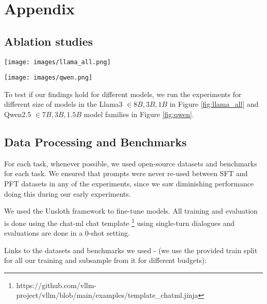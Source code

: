 \section{Appendix}

\subsection{Ablation studies}

\label{qwen}

\begin{figure*}[!ht]
    \centering
    \texttt{[image: images/llama\_all.png]}
    \caption{Performance of different SFT-PFT ratios on various models of Llama3 model family.}
    \label{fig:llama_all}
\end{figure*}

\begin{figure*}[!ht]
    \centering
    \texttt{[image: images/qwen.png]}
    \caption{Performance of different SFT-PFT ratios on various models of Qwen2.5 model family.}
    \label{fig:qwen}
\end{figure*}

To test if our findings hold for different models, we run the experiments for different size of models in the Llama3 $\in{8B, 3B, 1B}$ in Figure \ref{fig:llama_all} and Qwen2.5 $\in{7B, 3B, 1.5B}$ model families in Figure \ref{fig:qwen}. 


\subsection{Data Processing and Benchmarks}

\label{datasets}

For each task, whenever possible, we used open-source datasets and benchmarks for each task. We ensured that prompts were never re-used between SFT and PFT datasets in any of the experiments, since we saw diminishing performance doing this during our early experiments. 

We used the Unsloth framework \cite{unsloth} to fine-tune models. All training and evaluation is done using the chat-ml chat template \footnote{https://github.com/vllm-project/vllm/blob/main/examples/template\_chatml.jinja} using single-turn dialogues and evaluations are done in a 0-shot setting. 

Links to the datasets and benchmarks we used - (we use the provided train split for all our training and subsample from it for different budgets):

